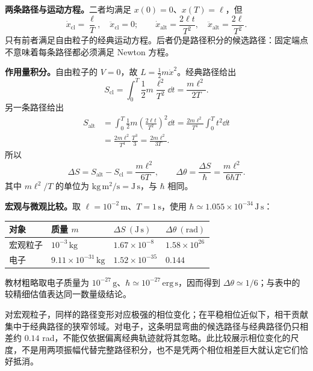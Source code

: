 \begin{checkedsolution}
\textbf{两条路径与运动方程。}二者均满足 $x(0)=0$、$x(T)=\ell$，但
\begin{equation}
  \dot x_{\mathrm{cl}}=\frac{\ell}{T},\quad
  \ddot x_{\mathrm{cl}}=0;\qquad
  \dot x_{\mathrm{alt}}=\frac{2\ell t}{T^2},\quad
  \ddot x_{\mathrm{alt}}=\frac{2\ell}{T^2}.
\end{equation}
只有前者满足自由粒子的经典运动方程。后者仍是路径积分的候选路径：固定端点不意味着每条路径都必须满足 Newton 方程。

\textbf{作用量积分。}自由粒子的 $V=0$，故 $L=\frac12m\dot x^2$。经典路径给出
\begin{equation}
  S_{\mathrm{cl}}
  =\int_0^T\frac12m\frac{\ell^2}{T^2}\dd t
  =\boxed{\frac{m\ell^2}{2T}}.
\end{equation}
另一条路径给出
\begin{align}
  S_{\mathrm{alt}}
  &=\int_0^T\frac12m\left(\frac{2\ell t}{T^2}\right)^2\dd t
    =\frac{2m\ell^2}{T^4}\int_0^Tt^2\dd t\\
  &=\frac{2m\ell^2}{T^4}\frac{T^3}{3}
    =\boxed{\frac{2m\ell^2}{3T}}.
\end{align}
所以
\begin{equation}
  \boxed{\Delta S=S_{\mathrm{alt}}-S_{\mathrm{cl}}
    =\frac{m\ell^2}{6T}},\qquad
  \boxed{\Delta\theta=\frac{\Delta S}{\hbar}
    =\frac{m\ell^2}{6\hbar T}}.
  \label{eq:QM-C08-S02-free-phase}
\end{equation}
其中 $m\ell^2/T$ 的单位为 $\mathrm{kg\,m^2/s}=\mathrm{J\,s}$，与 $\hbar$ 相同。

\noindent\begin{minipage}{\linewidth}
\textbf{宏观与微观比较。}取 $\ell=10^{-2}\,\mathrm m$、$T=1\,\mathrm s$，使用 $\hbar\simeq1.055\times10^{-34}\,\mathrm{J\,s}$：
\begin{center}
\begin{tabular}{@{}llll@{}}
  \toprule
  对象 & 质量 $m$ & $\Delta S\ (\mathrm{J\,s})$ & $\Delta\theta\ (\mathrm{rad})$\\
  \midrule
  宏观粒子 & $10^{-3}\,\mathrm{kg}$ & $1.67\times10^{-8}$ & $1.58\times10^{26}$\\
  电子 & $9.11\times10^{-31}\,\mathrm{kg}$ & $1.52\times10^{-35}$ & $0.144$\\
  \bottomrule
\end{tabular}
\end{center}
\end{minipage}\par
教材粗略取电子质量为 $10^{-27}\,\mathrm g$、$\hbar\simeq10^{-27}\,\mathrm{erg\,s}$，因而得到 $\Delta\theta\simeq1/6$；与表中的较精细估值表达同一数量级结论。

对宏观粒子，同样的路径变形对应极强的相位变化；在平稳相位近似下，相干贡献集中于经典路径的狭窄邻域。对电子，这条明显弯曲的候选路径与经典路径仍只相差约 $0.14$ rad，不能仅依据偏离经典轨迹就将其忽略。此比较展示相位变化的尺度，不是用两项振幅代替完整路径积分，也不是凭两个相位相差巨大就认定它们恰好抵消。
\end{checkedsolution}

